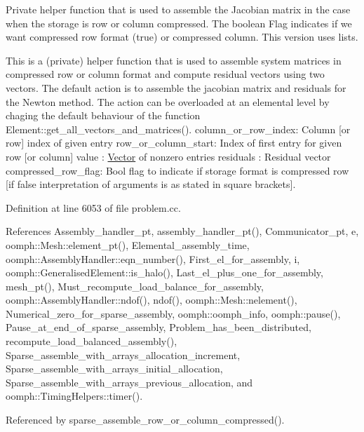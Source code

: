 Private helper function that is used to assemble the Jacobian matrix in the case when the storage is row or column compressed. The boolean Flag indicates if we want compressed row format (true) or compressed column. This version uses lists. 

This is a (private) helper function that is used to assemble system matrices in compressed row or column format and compute residual vectors using two vectors. The default action is to assemble the jacobian matrix and residuals for the Newton method. The action can be overloaded at an elemental level by chaging the default behaviour of the function Element\+::get\+\_\+all\+\_\+vectors\+\_\+and\+\_\+matrices(). column\+\_\+or\+\_\+row\+\_\+index\+: Column \mbox{[}or row\mbox{]} index of given entry row\+\_\+or\+\_\+column\+\_\+start\+: Index of first entry for given row \mbox{[}or column\mbox{]} value \+: \hyperlink{classoomph_1_1Vector}{Vector} of nonzero entries residuals \+: Residual vector compressed\+\_\+row\+\_\+flag\+: Bool flag to indicate if storage format is compressed row \mbox{[}if false interpretation of arguments is as stated in square brackets\mbox{]}. 

Definition at line 6053 of file problem.\+cc.



References Assembly\+\_\+handler\+\_\+pt, assembly\+\_\+handler\+\_\+pt(), Communicator\+\_\+pt, e, oomph\+::\+Mesh\+::element\+\_\+pt(), Elemental\+\_\+assembly\+\_\+time, oomph\+::\+Assembly\+Handler\+::eqn\+\_\+number(), First\+\_\+el\+\_\+for\+\_\+assembly, i, oomph\+::\+Generalised\+Element\+::is\+\_\+halo(), Last\+\_\+el\+\_\+plus\+\_\+one\+\_\+for\+\_\+assembly, mesh\+\_\+pt(), Must\+\_\+recompute\+\_\+load\+\_\+balance\+\_\+for\+\_\+assembly, oomph\+::\+Assembly\+Handler\+::ndof(), ndof(), oomph\+::\+Mesh\+::nelement(), Numerical\+\_\+zero\+\_\+for\+\_\+sparse\+\_\+assembly, oomph\+::oomph\+\_\+info, oomph\+::pause(), Pause\+\_\+at\+\_\+end\+\_\+of\+\_\+sparse\+\_\+assembly, Problem\+\_\+has\+\_\+been\+\_\+distributed, recompute\+\_\+load\+\_\+balanced\+\_\+assembly(), Sparse\+\_\+assemble\+\_\+with\+\_\+arrays\+\_\+allocation\+\_\+increment, Sparse\+\_\+assemble\+\_\+with\+\_\+arrays\+\_\+initial\+\_\+allocation, Sparse\+\_\+assemble\+\_\+with\+\_\+arrays\+\_\+previous\+\_\+allocation, and oomph\+::\+Timing\+Helpers\+::timer().



Referenced by sparse\+\_\+assemble\+\_\+row\+\_\+or\+\_\+column\+\_\+compressed().

\mbox{\label{classoomph_1_1Problem_a767f7064ccbdcc2a039e0360b98dc48d}} 
